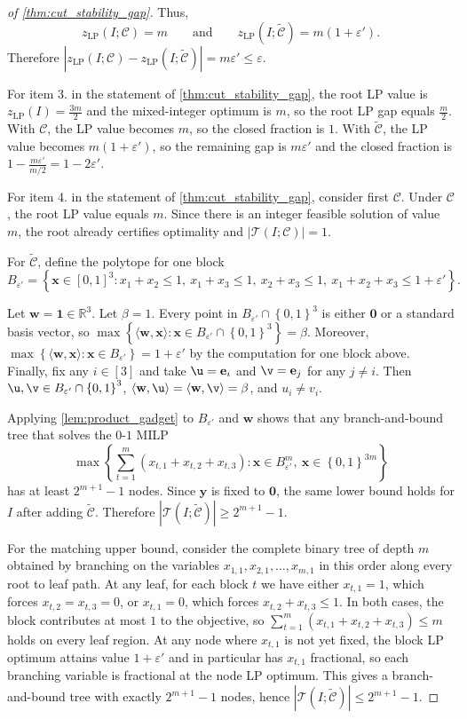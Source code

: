 \documentclass[smallextended,envcountsect]{svjour3} %
\let\ACCu\u
\let\ACCv\v
\newcommand{\set}[1]{\left\{#1\right\}}
\newcommand{\R}{\mathbb{R}}
\newcommand{\x}{\mathbf{x}}
\newcommand{\y}{\mathbf{y}}
\newcommand{\w}{\mathbf{w}}
\newcommand{\e}{\mathbf{e}}
\renewcommand{\u}{\mathbf{u}}
\renewcommand{\v}{\mathbf{v}}
\newcommand{\Tcal}{\mathcal{T}}
\newcommand{\Ccal}{\mathcal{C}}
\newcommand{\0}{\mathbf{0}}
\newcommand{\LP}{\mathrm{LP}}
\newcommand{\1}{\mathbf{1}} %
\let\u\ACCu
\let\v\ACCv
\begin{document}
\begin{proof}[of \cref{thm:cut_stability_gap}]
	Thus,
	\[
			z_{\LP}(I;\Ccal)=m
			\qquad\text{and}\qquad
			z_{\LP}(I;\widetilde{\Ccal})=m(1+\varepsilon').
	\]
		Therefore $|z_{\LP}(I;\Ccal)-z_{\LP}(I;\widetilde{\Ccal})|=m\varepsilon'\le \varepsilon$.

			For item 3. in the statement of \cref{thm:cut_stability_gap}, the root LP value is $z_{\LP}(I)=\frac{3m}{2}$ and the mixed-integer optimum is $m$, so the root LP gap equals $\frac{m}{2}$.
		With $\Ccal$, the LP value becomes $m$, so the closed fraction is $1$.
		With $\widetilde{\Ccal}$, the LP value becomes $m(1+\varepsilon')$, so the remaining gap is $m\varepsilon'$ and the closed fraction is $1-\frac{m\varepsilon'}{m/2}=1-2\varepsilon'$.

		For item 4. in the statement of \cref{thm:cut_stability_gap}, consider first $\Ccal$. Under $\Ccal$, the root LP value equals $m$.
		Since there is an integer feasible solution of value $m$, the root already certifies optimality and $|\Tcal(I;\Ccal)|=1$.

		For $\widetilde{\Ccal}$, define the polytope for one block
		\[
			B_{\varepsilon'}=\set{\x\in [0,1]^3 :
				x_1+x_2\le 1,\ x_1+x_3\le 1,\ x_2+x_3\le 1,\ x_1+x_2+x_3\le 1+\varepsilon'}.
		\]

	Let $\w=\1 \in \R^3$.
	Let $\beta=1$.
	Every point in $B_{\varepsilon'}\cap\set{0,1}^3$ is either $\0$ or a standard basis vector, so $\max\set{\langle\w,\x\rangle:\x\in B_{\varepsilon'}\cap\set{0,1}^3}=\beta$.
	Moreover, $\max\set{\langle\w,\x\rangle:\x\in B_{\varepsilon'}}=1+\varepsilon'$ by the computation for one block above.
	Finally, fix any $i\in[3]$ and take $\u=\e_i$ and $\v=\e_j$ for any $j\neq i$.
	Then $\u,\v\in B_{\varepsilon'}\cap\set{0,1}^3$, $\langle\w,\u\rangle=\langle\w,\v\rangle=\beta$, and $u_i\neq v_i$.

	Applying \cref{lem:product_gadget} to $B_{\varepsilon'}$ and $\w$ shows that any branch-and-bound tree that solves the $0$-$1$ MILP
	\[
		\max\set{\sum_{t=1}^m(x_{t,1}+x_{t,2}+x_{t,3}):\x\in B_{\varepsilon'}^m,\ \x\in\set{0,1}^{3m}}
	\]
	has at least $2^{m+1}-1$ nodes.
	Since $\y$ is fixed to $\0$, the same lower bound holds for $I$ after adding $\widetilde{\Ccal}$.
	Therefore $|\Tcal(I;\widetilde{\Ccal})|\ge 2^{m+1}-1$.

	For the matching upper bound, consider the complete binary tree of depth $m$ obtained by branching on the variables $x_{1,1},x_{2,1},\dots,x_{m,1}$ in this order along every root to leaf path.
	At any leaf, for each block $t$ we have either $x_{t,1}=1$, which forces $x_{t,2}=x_{t,3}=0$, or $x_{t,1}=0$, which forces $x_{t,2}+x_{t,3}\le 1$.
	In both cases, the block contributes at most $1$ to the objective, so $\sum_{t=1}^m(x_{t,1}+x_{t,2}+x_{t,3})\le m$ holds on every leaf region.
	At any node where $x_{t,1}$ is not yet fixed, the block LP optimum attains value $1+\varepsilon'$ and in particular has $x_{t,1}$ fractional, so each branching variable is fractional at the node LP optimum.
	This gives a branch-and-bound tree with exactly $2^{m+1}-1$ nodes, hence $|\Tcal(I;\widetilde{\Ccal})|\le 2^{m+1}-1$.


\end{proof}
\end{document}
